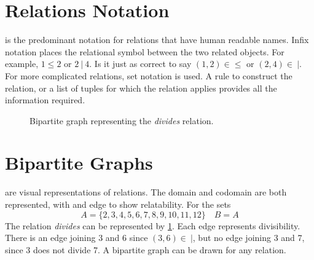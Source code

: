 \documentclass[10pt]{book}
\newcommand{\newthought}[1]{\vspace{0.5\baselineskip}\noindent{\scshape #1}}
\begin{document}
\section{Relations Notation}
\newthought{Infix notation} is the predominant notation for relations that have human readable names. Infix notation places
the relational symbol between the two related objects. For example, $1 \le 2$ or $2\ |\ 4$. Is it just as correct to say
$(1,2) \in \le$ or $(2,4) \in\ |$. For more complicated relations, set notation is used. A rule to construct the relation, or
a list of tuples for which the relation applies provides all the information required.
\begin{figure}[h]
  \centering
  \caption{Bipartite graph representing the \emph{divides} relation.}
  \label{fig:relation_divides}
\end{figure}
\section{Bipartite Graphs}
\newthought{Bipartite graphs} are visual representations of relations. The domain and codomain are both represented, with
and edge to show relatability. For the sets
\[
  A=\{2,3,4,5,6,7,8,9,10,11,12\} \quad B=A
\]
The relation \emph{divides} can be represented by \cref{fig:relation_divides}. Each edge represents divisibility. There is
an edge joining 3 and 6 since $(3,6) \in\ |$, but no edge joining 3 and 7, since 3 does not divide 7. A bipartite graph
can be drawn for any relation.
\end{document}
